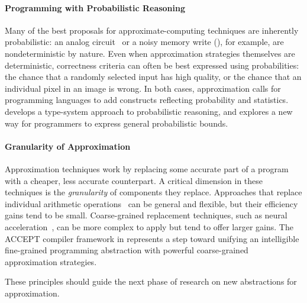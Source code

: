 \paragraph{Programming with Probabilistic Reasoning}
Many of the best proposals for approximate-computing techniques are inherently
probabilistic:
an analog circuit~\cite{anpu} or a noisy memory write (),
for example, are nondeterministic by nature.
Even when approximation strategies themselves are deterministic, correctness
criteria can often be best expressed using probabilities: the chance that a
randomly selected input has high quality, or the chance that an individual
pixel in an image is wrong.
In both cases, approximation calls for programming languages to add constructs
reflecting probability and statistics.
 develops a type-system approach to probabilistic reasoning,
and  explores a new way for programmers to express
general probabilistic bounds.

\paragraph{Granularity of Approximation}
Approximation techniques work by replacing some accurate part of a program
with a cheaper, less accurate counterpart.
A critical dimension in these techniques is the \emph{granularity} of
components they replace.
Approaches that replace individual arithmetic operations~\cite{truffle} can be
general and flexible, but their efficiency gains tend to be small.
Coarse-grained replacement techniques, such as neural acceleration~\cite{npu},
can be more complex to apply
but tend to offer larger gains.
The ACCEPT compiler framework in  represents a step toward
unifying an intelligible fine-grained programming abstraction
with powerful coarse-grained approximation strategies.

\vspace{\baselineskip}
\noindent
These principles should guide the next phase of research on new abstractions
for approximation.

